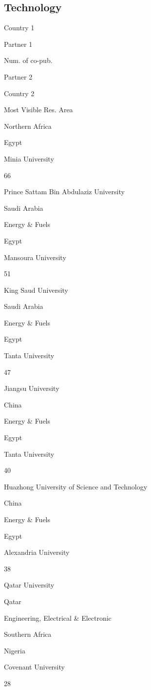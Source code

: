 \documentclass[12pt,twoside]{report}
\begin{document}
\hypertarget{technology}{%
\subsection{Technology}\label{technology}}

Country 1

Partner 1

Num. of co-pub.

Partner 2

Country 2

Most Visible Res. Area

Northern Africa

{Egypt }

{Minia University }

{66}

{Prince Sattam Bin Abdulaziz University }

{Saudi Arabia }

{Energy \& Fuels }

{Egypt }

{Mansoura University }

{51}

{King Saud University }

{Saudi Arabia }

{Energy \& Fuels }

{Egypt }

{Tanta University }

{47}

{Jiangsu University }

{China }

{Energy \& Fuels }

{Egypt }

{Tanta University }

{40}

{Huazhong University of Science and Technology}

{China }

{Energy \& Fuels }

{Egypt }

{Alexandria University }

{38}

{Qatar University }

{Qatar }

{Engineering, Electrical \& Electronic }

Southern Africa

{Nigeria }

{Covenant University }

{28}
\end{document}
